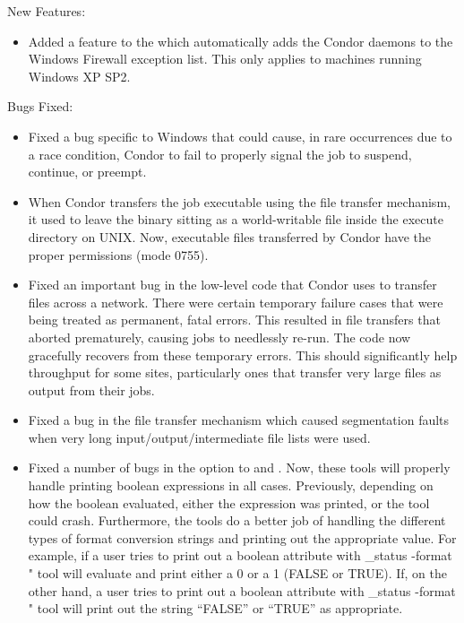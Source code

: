 \noindent New Features:

\begin{itemize}

\item Added a feature to the  which automatically adds
the Condor daemons to the Windows Firewall exception list. This only
applies to machines running Windows XP SP2.

\end{itemize}

\noindent Bugs Fixed:

\begin{itemize}

\item Fixed a bug specific to Windows that could cause, in rare occurrences
due to a race condition, Condor to fail to properly signal the job to
suspend, continue, or preempt.

\item When Condor transfers the job executable using the file transfer
  mechanism, it used to leave the binary sitting as a world-writable
  file inside the execute directory on UNIX.
  Now, executable files transferred by Condor have the proper
  permissions (mode 0755).

\item Fixed an important bug in the low-level code that Condor uses to
  transfer files across a network.
  There were certain temporary failure cases that were being treated
  as permanent, fatal errors.
  This resulted in file transfers that aborted prematurely, causing
  jobs to needlessly re-run.
  The code now gracefully recovers from these temporary errors.
  This should significantly help throughput for some sites,
  particularly ones that transfer very large files as output from
  their jobs.
 
\item Fixed a bug in the file transfer mechanism which caused
  segmentation faults when very long input/output/intermediate file
  lists were used.

\item Fixed a number of bugs in the  option to 
  and .
  Now, these tools will properly handle printing boolean expressions
  in all cases.
  Previously, depending on how the boolean evaluated, either the
  expression was printed, or the tool could crash.
  Furthermore, the tools do a better job of handling the different 
  types of format conversion strings and printing out the appropriate
  value.
  For example, if a user tries to print out a boolean attribute with
  \verb@condor_status -format "%d\n" HasFileTransfer@, the
   tool will evaluate  and print
  either a 0 or a 1 (FALSE or TRUE).
  If, on the other hand, a user tries to print out a boolean attribute
  with \verb@condor_status -format "%s\n" HasFileTransfer@, the
   tool will print out the string ``FALSE'' or ``TRUE''
  as appropriate.


\end{itemize}
